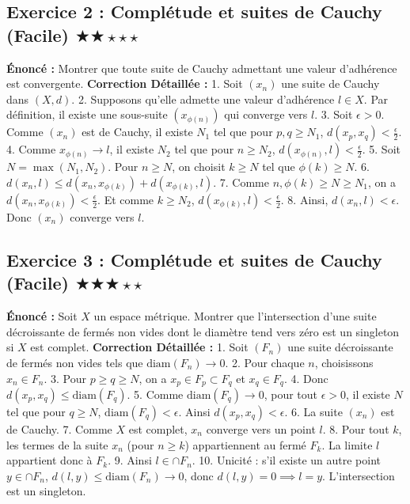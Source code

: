 \documentclass[11pt,a4paper]{article}
\begin{document}
\subsection*{Exercice 2 : Complétude et suites de Cauchy (Facile) \quad $\bigstar\bigstar\star\star\star$}

\textbf{Énoncé :}
Montrer que toute suite de Cauchy admettant une valeur d'adhérence est convergente.
\textbf{Correction Détaillée :}
1. Soit $(x_n)$ une suite de Cauchy dans $(X,d)$.
2. Supposons qu'elle admette une valeur d'adhérence $l \in X$. Par définition, il existe une sous-suite $(x_{\phi(n)})$ qui converge vers $l$.
3. Soit $\epsilon > 0$. Comme $(x_n)$ est de Cauchy, il existe $N_1$ tel que pour $p, q \geq N_1$, $d(x_p, x_q) < \frac{\epsilon}{2}$.
4. Comme $x_{\phi(n)} \to l$, il existe $N_2$ tel que pour $n \geq N_2$, $d(x_{\phi(n)}, l) < \frac{\epsilon}{2}$.
5. Soit $N = \max(N_1, N_2)$. Pour $n \geq N$, on choisit $k \geq N$ tel que $\phi(k) \geq N$.
6. $d(x_n, l) \leq d(x_n, x_{\phi(k)}) + d(x_{\phi(k)}, l)$.
7. Comme $n, \phi(k) \geq N \geq N_1$, on a $d(x_n, x_{\phi(k)}) < \frac{\epsilon}{2}$. Et comme $k \geq N_2$, $d(x_{\phi(k)}, l) < \frac{\epsilon}{2}$.
8. Ainsi, $d(x_n, l) < \epsilon$. Donc $(x_n)$ converge vers $l$.


\subsection*{Exercice 3 : Complétude et suites de Cauchy (Facile) \quad $\bigstar\bigstar\bigstar\star\star$}

\textbf{Énoncé :}
Soit $X$ un espace métrique. Montrer que l'intersection d'une suite décroissante de fermés non vides dont le diamètre tend vers zéro est un singleton si $X$ est complet.
\textbf{Correction Détaillée :}
1. Soit $(F_n)$ une suite décroissante de fermés non vides tels que $\text{diam}(F_n) \to 0$.
2. Pour chaque $n$, choisissons $x_n \in F_n$.
3. Pour $p \geq q \geq N$, on a $x_p \in F_p \subset F_q$ et $x_q \in F_q$.
4. Donc $d(x_p, x_q) \leq \text{diam}(F_q)$.
5. Comme $\text{diam}(F_q) \to 0$, pour tout $\epsilon > 0$, il existe $N$ tel que pour $q \geq N$, $\text{diam}(F_q) < \epsilon$. Ainsi $d(x_p, x_q) < \epsilon$.
6. La suite $(x_n)$ est de Cauchy.
7. Comme $X$ est complet, $x_n$ converge vers un point $l$.
8. Pour tout $k$, les termes de la suite $x_n$ (pour $n \geq k$) appartiennent au fermé $F_k$. La limite $l$ appartient donc à $F_k$.
9. Ainsi $l \in \cap F_n$.
10. Unicité : s'il existe un autre point $y \in \cap F_n$, $d(l, y) \leq \text{diam}(F_n) \to 0$, donc $d(l, y) = 0 \implies l=y$. L'intersection est un singleton.
\end{document}
